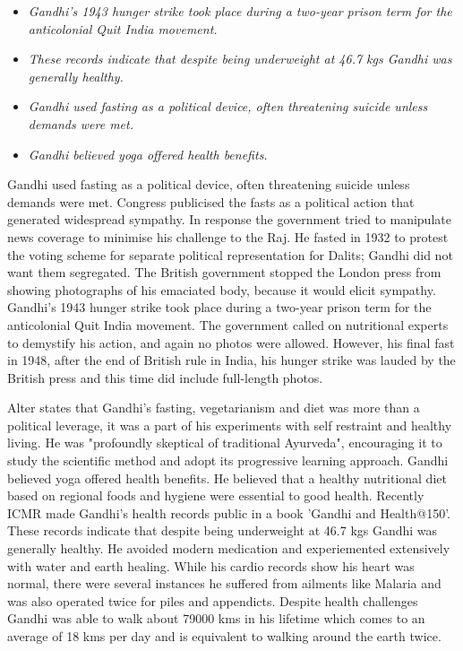 \begin{itemize}
\item
  \emph{Gandhi's 1943 hunger strike took place during a two-year prison
  term for the anticolonial Quit India movement.}
\item
  \emph{These records indicate that despite being underweight at 46.7
  kgs Gandhi was generally healthy.}
\item
  \emph{Gandhi used fasting as a political device, often threatening
  suicide unless demands were met.}
\item
  \emph{Gandhi believed yoga offered health benefits.}
\end{itemize}

Gandhi used fasting as a political device, often threatening suicide
unless demands were met. Congress publicised the fasts as a political
action that generated widespread sympathy. In response the government
tried to manipulate news coverage to minimise his challenge to the Raj.
He fasted in 1932 to protest the voting scheme for separate political
representation for Dalits; Gandhi did not want them segregated. The
British government stopped the London press from showing photographs of
his emaciated body, because it would elicit sympathy. Gandhi's 1943
hunger strike took place during a two-year prison term for the
anticolonial Quit India movement. The government called on nutritional
experts to demystify his action, and again no photos were allowed.
However, his final fast in 1948, after the end of British rule in India,
his hunger strike was lauded by the British press and this time did
include full-length photos.

Alter states that Gandhi's fasting, vegetarianism and diet was more than
a political leverage, it was a part of his experiments with self
restraint and healthy living. He was "profoundly skeptical of
traditional Ayurveda", encouraging it to study the scientific method and
adopt its progressive learning approach. Gandhi believed yoga offered
health benefits. He believed that a healthy nutritional diet based on
regional foods and hygiene were essential to good health. Recently ICMR
made Gandhi's health records public in a book 'Gandhi and Health@150'.
These records indicate that despite being underweight at 46.7 kgs Gandhi
was generally healthy. He avoided modern medication and experiemented
extensively with water and earth healing. While his cardio records show
his heart was normal, there were several instances he suffered from
ailments like Malaria and was also operated twice for piles and
appendicts. Despite health challenges Gandhi was able to walk about
79000 kms in his lifetime which comes to an average of 18 kms per day
and is equivalent to walking around the earth twice.

